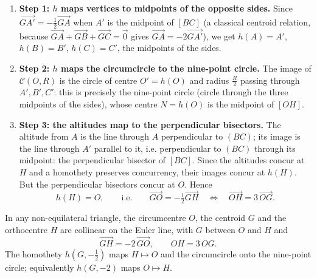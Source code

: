 \documentclass[11pt]{article}
\newcommand{\cle}[1]{{\popxbold\color{popdark}#1}}
\begin{document}
\begin{enumerate}
\item \textbf{Step 1: $h$ maps vertices to midpoints of the opposite sides.} Since $\vec{GA'} = -\tfrac12 \vec{GA}$ when $A'$ is the midpoint of $[BC]$ (a classical centroid relation, because $\vec{GA} + \vec{GB} + \vec{GC} = \vec{0}$ gives $\vec{GA} = -2\vec{GA'}$), we get $h(A) = A'$, $h(B) = B'$, $h(C) = C'$, the midpoints of the sides.
\item \textbf{Step 2: $h$ maps the circumcircle to the nine-point circle.} The image of $\mathcal{C}(O, R)$ is the circle of centre $O' = h(O)$ and radius $\tfrac{R}{2}$ passing through $A', B', C'$: this is precisely the \cle{nine-point circle} (circle through the three midpoints of the sides), whose centre $N = h(O)$ is the midpoint of $[OH]$.
\item \textbf{Step 3: the altitudes map to the perpendicular bisectors.} The altitude from $A$ is the line through $A$ perpendicular to $(BC)$; its image is the line through $A'$ parallel to it, i.e. perpendicular to $(BC)$ through its midpoint: the perpendicular bisector of $[BC]$. Since the altitudes concur at $H$ and a homothety preserves concurrency, their images concur at $h(H)$. But the perpendicular bisectors concur at $O$. Hence
\[ h(H) = O, \qquad\text{i.e.}\qquad \vec{GO} = -\tfrac12 \vec{GH} \quad\Longleftrightarrow\quad \vec{OH} = 3\,\vec{OG}. \]
\end{enumerate}

\begin{propriete}
In any non-equilateral triangle, the circumcentre $O$, the centroid $G$ and the orthocentre $H$ are collinear on the \cle{Euler line}, with $G$ between $O$ and $H$ and
\[ \vec{GH} = -2\,\vec{GO}, \qquad OH = 3\,OG. \]
The homothety $h(G, -\tfrac12)$ maps $H \mapsto O$ and the circumcircle onto the nine-point circle; equivalently $h(G, -2)$ maps $O \mapsto H$.
\end{propriete}
\end{document}
